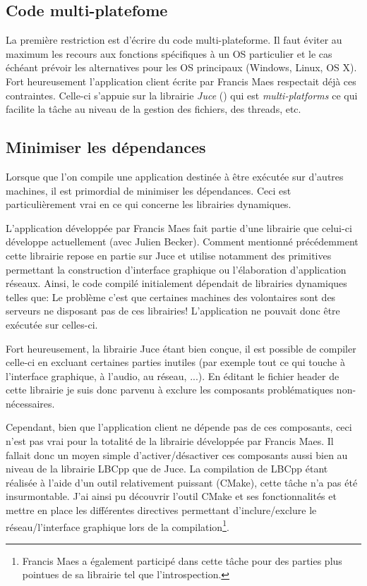 \documentclass[a4paper, 11pt]{report}
\begin{document}
\subsection{Code multi-platefome}
La première restriction est d'écrire du code multi-plateforme. Il faut éviter au maximum les recours aux fonctions spécifiques à un OS particulier et le cas échéant prévoir les alternatives pour les OS principaux (Windows, Linux, OS X). Fort heureusement l'application client écrite par Francis Maes respectait déjà ces contraintes. Celle-ci s'appuie sur la librairie \textit{Juce} ()%
qui est \textit{multi-platforms} ce qui facilite la tâche au niveau de la gestion des fichiers, des threads, etc.


\subsection{Minimiser les dépendances}
Lorsque que l'on compile une application destinée à être exécutée sur d'autres machines, il est primordial de minimiser les dépendances. Ceci est particulièrement vrai en ce qui concerne les librairies dynamiques.

L'application développée par Francis Maes fait partie d'une librairie que celui-ci développe actuellement (avec Julien Becker). Comment mentionné précédemment cette librairie repose en partie sur Juce et utilise notamment des primitives permettant la construction d'interface graphique ou l'élaboration d'application réseaux. Ainsi, le code compilé initialement dépendait de librairies dynamiques telles que: %
Le problème c'est que certaines machines des volontaires sont des serveurs ne disposant pas de ces librairies! L'application ne pouvait donc être exécutée sur celles-ci.

Fort heureusement, la librairie Juce étant bien conçue, il est possible de compiler celle-ci en excluant certaines parties inutiles (par exemple tout ce qui touche à l'interface graphique, à l'audio, au réseau, ...). En éditant le fichier header de cette librairie je suis donc parvenu à exclure les composants problématiques non-nécessaires.

Cependant, bien que l'application client ne dépende pas de ces composants, ceci n'est pas vrai pour la totalité de la librairie développée par Francis Maes. Il fallait donc un moyen simple d'activer/désactiver ces composants aussi bien au niveau de la librairie LBCpp que de Juce. La compilation de LBCpp étant réalisée à l'aide d'un outil relativement puissant (CMake), cette tâche n'a pas été insurmontable. J'ai ainsi pu découvrir l'outil CMake et ses fonctionnalités et mettre en place les différentes directives permettant d'inclure/exclure le réseau/l'interface graphique lors de la compilation\footnote{Francis Maes a également participé dans cette tâche pour des parties plus pointues de sa librairie tel que l'introspection.}. 
\end{document}
